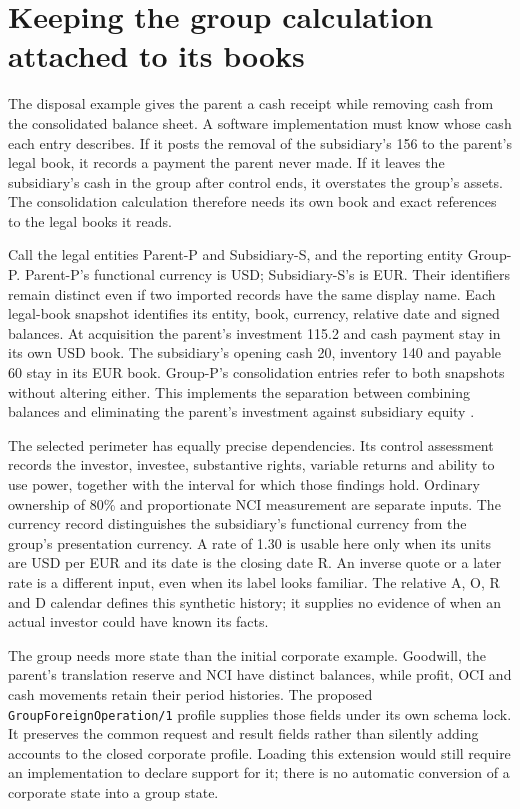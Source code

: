\section{Keeping the group calculation attached to its books}
\label{sec:group-record-bindings}

The disposal example gives the parent a cash receipt while removing cash
from the consolidated balance sheet. A software implementation must know
whose cash each entry describes. If it posts the removal of the subsidiary's
156 to the parent's legal book, it records a payment the parent never made.
If it leaves the subsidiary's cash in the group after control ends, it
overstates the group's assets. The consolidation calculation therefore needs
its own book and exact references to the legal books it reads.

Call the legal entities Parent-P and Subsidiary-S, and the reporting entity
Group-P. Parent-P's functional currency is USD; Subsidiary-S's is EUR.
Their identifiers remain distinct even if two imported records have the same
display name. Each legal-book snapshot identifies its entity, book, currency,
relative date and signed balances. At acquisition the parent's investment
115.2 and cash payment stay in its own USD book. The subsidiary's opening
cash 20, inventory 140 and payable 60 stay in its EUR book. Group-P's
consolidation entries refer to both snapshots without altering either.
This implements the separation between combining balances and eliminating
the parent's investment against subsidiary equity
\citep[IFRS~10.B86--88]{eu20231803}.

The selected perimeter has equally precise dependencies. Its control
assessment records the investor, investee, substantive rights, variable
returns and ability to use power, together with the interval for which
those findings hold. Ordinary ownership of 80\% and proportionate NCI
measurement are separate inputs. The currency record distinguishes the
subsidiary's functional currency from the group's presentation currency.
A rate of 1.30 is usable here only when its units are USD per EUR and its
date is the closing date R. An inverse quote or a later rate is a different
input, even when its label looks familiar. The relative A, O, R and D
calendar defines this synthetic history; it supplies no evidence of when an
actual investor could have known its facts.

The group needs more state than the initial corporate example. Goodwill,
the parent's translation reserve and NCI have distinct balances, while
profit, OCI and cash movements retain their period histories. The proposed
\texttt{GroupForeignOperation/1} profile supplies those fields under its own
schema lock. It preserves the common request and result fields rather than
silently adding accounts to the closed corporate profile. Loading this
extension would still require an implementation to declare support for it;
there is no automatic conversion of a corporate state into a group state.

